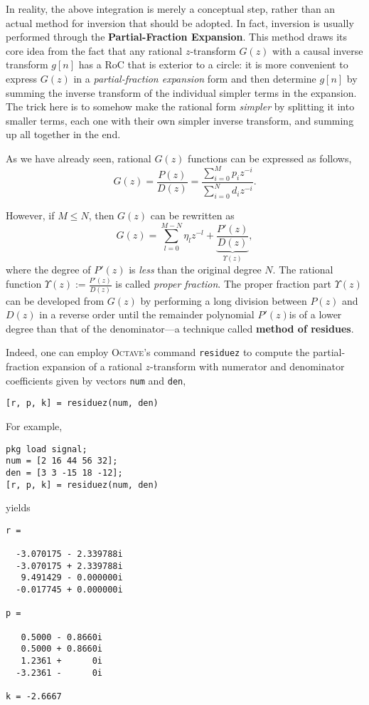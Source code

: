 \documentclass[\documentfontsize, twocolumn]{\classname}
\begin{document}
In reality, the above integration is merely a conceptual step, rather than an actual method for inversion that should be adopted. In fact, inversion is usually performed through the \textbf{Partial-Fraction Expansion}. This method draws its core idea from the fact that any rational $z$-transform $G(z)$ with a causal inverse transform $g[n]$ has a RoC that is exterior to a circle: it is more convenient to express $G(z)$ in a \emph{partial-fraction expansion} form and then determine $g[n]$ by summing the inverse transform of the individual simpler terms in the expansion. The trick here is to somehow make the rational form \emph{simpler} by splitting it into smaller terms, each one with their own simpler inverse transform, and summing up all together in the end.

As we have already seen, rational $G(z)$ functions can be expressed as follows,
\[
    G(z) = \frac{P(z)}{D(z)} =
    \frac {
        \sum_{i=0}^M p_i z^{-i}
    } {
        \sum_{i=0}^N d_i z^{-i}
    }.
\]

However, if $M\leq N$, then $G(z)$ can be rewritten as
\begin{equation}\label{eqn:partialFractionExpansion}
    G(z) = \sum_{l=0}^{M-N} \eta_l z^{-l} + \underbrace{\frac{P'(z)}{D(z)}}_{\Upsilon(z)},
\end{equation}
where the degree of $P'(z)$ is \emph{less} than the original degree $N$.
The rational function $\Upsilon(z) := \frac{P'(z)}{D(z)}$ is called \emph{proper fraction}. The proper fraction part $\Upsilon(z)$ can be developed from $G(z)$ by performing a long division between $P(z)$ and $D(z)$ in a reverse order until the remainder polynomial $P'(z)$is of a lower degree than that of the denominator---a technique called \textbf{method of residues}.

Indeed, one can employ \textsc{Octave}'s command \texttt{residuez} to compute the partial-fraction expansion of a rational $z$-transform with numerator and denominator coefficients given by vectors \texttt{num} and \texttt{den},
\begin{verbatim}
[r, p, k] = residuez(num, den)
\end{verbatim}
For example,
\begin{verbatim}
pkg load signal;
num = [2 16 44 56 32];
den = [3 3 -15 18 -12];
[r, p, k] = residuez(num, den)
\end{verbatim}
yields
\begin{verbatim}
r =

  -3.070175 - 2.339788i
  -3.070175 + 2.339788i
   9.491429 - 0.000000i
  -0.017745 + 0.000000i

p =

   0.5000 - 0.8660i
   0.5000 + 0.8660i
   1.2361 +      0i
  -3.2361 -      0i

k = -2.6667
\end{verbatim}
\end{document}
